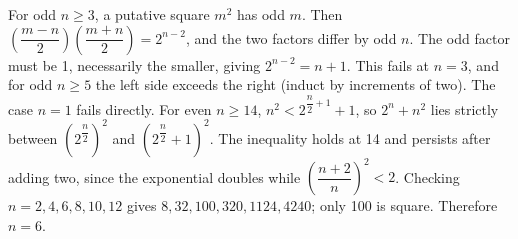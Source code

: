 For odd $n\ge3$, a putative square $m^2$ has odd $m$. Then $(\dfrac{m-n}{2}) (\dfrac{m+n}{2}) = 2^{n-2}$, and the two factors differ by odd $n$. The odd factor must be 1, necessarily the smaller, giving $2^{n-2}=n+1$. This fails at $n=3$, and for odd $n\ge5$ the left side exceeds the right (induct by increments of two). The case $n=1$ fails directly. For even $n\ge14$, $n^2 < 2^{\dfrac{n}{2} + 1} + 1$, so $2^n+n^2$ lies strictly between $(2^{\dfrac{n}{2}})^2$ and $(2^{\dfrac{n}{2}} + 1)^2$. The inequality holds at 14 and persists after adding two, since the exponential doubles while $(\dfrac{n+2}{n})^2 < 2$. Checking $n=2,4,6,8,10,12$ gives $8,32,100,320,1124,4240$; only 100 is square. Therefore $\boxed{n=6}$.
